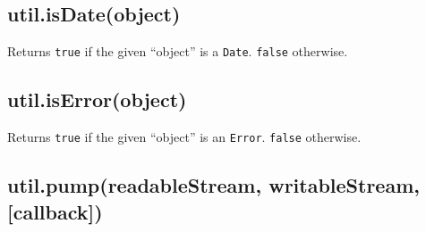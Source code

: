 \subsection{util.isDate(object)}

Returns \texttt{true} if the given ``object'' is a \texttt{Date}.
\texttt{false} otherwise.

\begin{Shaded}
\begin{Highlighting}[]
 \NormalTok{);}

\NormalTok{(} \NormalTok{())}
\NormalTok{(}\NormalTok{())}
\NormalTok{(\{\})}
\end{Highlighting}
\end{Shaded}

\subsection{util.isError(object)}

Returns \texttt{true} if the given ``object'' is an \texttt{Error}.
\texttt{false} otherwise.

\begin{Shaded}
\begin{Highlighting}[]
 \NormalTok{);}

\NormalTok{(} 
\NormalTok{(} 
\NormalTok{(\{ }\NormalTok{: }\NormalTok{, }\NormalTok{: } \NormalTok{\})}
\end{Highlighting}
\end{Shaded}

\subsection{util.pump(readableStream, writableStream, {[}callback{]})}


